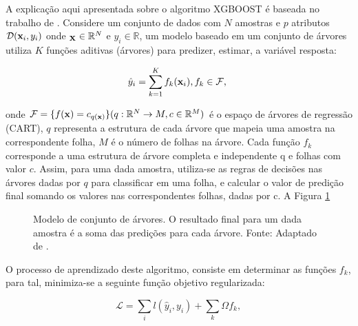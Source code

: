 A explicação aqui apresentada sobre o algoritmo XGBOOST é baseada no trabalho de \cite{CHEN:2016}. Considere um conjunto de dados com $N$ amostras e $p$ atributos $\mathcal{D}({\bf x}_i, y_i)$ onde $_{\bf X}\in\mathbb{R}^N$ e $y_i\in\mathbb{R}$, um modelo baseado em um conjunto de árvores utiliza $K$ funções aditivas (árvores) para predizer, estimar, a variável resposta:

\begin{equation}\label{eq:xgboost}
\hat{y}_i=\sum_{k=1}^{K}f_{k}({\bf x}_i)\mbox{,}\,f_{k}\in\mathcal{F}\mbox{,}~
\end{equation}

onde $\mathcal{F}=\{f({\bf x})=c_{q({\bf x})}\}(q:\mathbb{R}^N\to{M},c\in\mathbb{R}^{M})$ é o espaço de árvores de regressão (CART), $q$ representa a estrutura de cada árvore que mapeia uma amostra na correspondente folha, $M$ é o número de folhas na árvore. Cada função $f_k$ corresponde a uma estrutura de árvore completa e independente q e folhas com valor $c$. Assim, para uma dada amostra, utiliza-se as regras de decisões nas árvores dadas por $q$ para classificar em uma folha, e calcular o valor de predição final somando os valores nas correspondentes folhas, dadas por c. A Figura \ref{fig:tree_model}

\begin{figure}[H]
\centering
{}
\caption{Modelo de conjunto de árvores. O resultado final para um dada amostra é a soma das predições para cada árvore. Fonte: Adaptado de \cite{CHEN:2016}.}
\label{fig:tree_model}
\end{figure}

O processo de aprendizado deste algoritmo, consiste em determinar as funções $f_k$, para tal, minimiza-se a seguinte função objetivo regularizada:

\begin{equation}\label{eq:xgboostmin}
\mathcal{L}=\sum_{i}l(\hat{y}_i, y_i)+\sum_{k}\Omega{f_k}\mbox{,}~
\end{equation}

